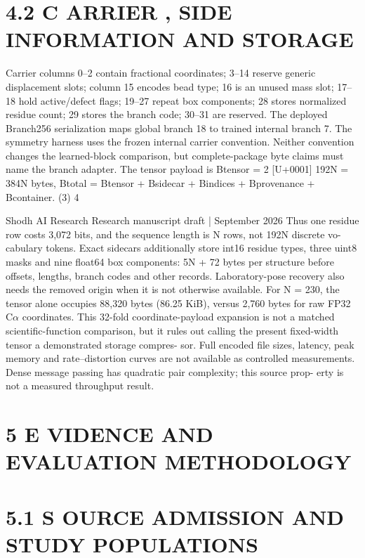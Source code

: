 \documentclass[11pt]{article}
\begin{document}
\section*{4.2 C ARRIER , SIDE INFORMATION AND STORAGE}

Carrier columns 0–2 contain fractional coordinates; 3–14 reserve generic displacement slots; column
15 encodes bead type; 16 is an unused mass slot; 17–18 hold active/defect flags; 19–27 repeat box
components; 28 stores normalized residue count; 29 stores the branch code; 30–31 are reserved. The
deployed Branch256 serialization maps global branch 18 to trained internal branch 7. The symmetry
harness uses the frozen internal carrier convention. Neither convention changes the learned-block
comparison, but complete-package byte claims must name the branch adapter.
The tensor payload is
Btensor = 2 [U+0001] 192N = 384N bytes,
Btotal = Btensor + Bsidecar + Bindices + Bprovenance + Bcontainer. (3)
4

Shodh AI Research Research manuscript draft | September 2026
Thus one residue row costs 3,072 bits, and the sequence length is N rows, not 192N discrete vo-
cabulary tokens. Exact sidecars additionally store int16 residue types, three uint8 masks and
nine float64 box components: 5N + 72 bytes per structure before offsets, lengths, branch codes
and other records. Laboratory-pose recovery also needs the removed origin when it is not otherwise
available.
For N = 230, the tensor alone occupies 88,320 bytes (86.25 KiB), versus 2,760 bytes for raw FP32
C\ensuremath{\alpha} coordinates. This 32-fold coordinate-payload expansion is not a matched scientific-function
comparison, but it rules out calling the present fixed-width tensor a demonstrated storage compres-
sor. Full encoded file sizes, latency, peak memory and rate–distortion curves are not available as
controlled measurements. Dense message passing has quadratic pair complexity; this source prop-
erty is not a measured throughput result.

\section*{5 E VIDENCE AND EVALUATION METHODOLOGY}


\section*{5.1 S OURCE ADMISSION AND STUDY POPULATIONS}
\end{document}
